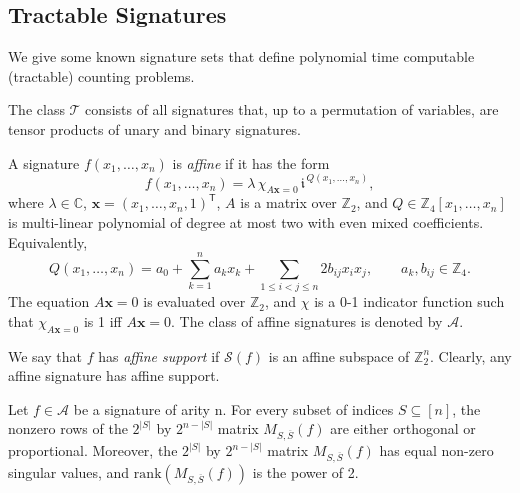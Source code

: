 
\subsection{Tractable Signatures}\label{subsec: tractable signatures}

We give some known signature sets that define polynomial time computable (tractable) counting problems.


\begin{definition}
    The class $\mathscr T$ consists of all signatures that, up to a
    permutation of variables, are tensor products of unary and binary signatures.
\end{definition}


\begin{definition}\label{def: affine}
A signature $f(x_1,\ldots,x_n)$ is \emph{affine} if it has the form
\[
f(x_1,\ldots,x_n)
=\lambda\,\chi_{A\mathbf x=0}\,
 \mathfrak i^{\,Q(x_1,\ldots,x_n)},
\]
where $\lambda\in\mathbb C$,
$\mathbf x=(x_1,\ldots,x_n,1)^{\mathsf T}$, $A$ is a matrix over
$\mathbb Z_2$, and $Q\in\mathbb Z_4[x_1,\ldots,x_n]$ is multi-linear polynomial of
degree at most two with even mixed coefficients.  
Equivalently,
\[
Q(x_1,\ldots,x_n)
=a_0+\sum_{k=1}^n a_kx_k
 +\sum_{1\le i<j\le n}2b_{ij}x_ix_j,
\qquad a_k,b_{ij}\in\mathbb Z_4.
\]
The equation $A\mathbf x=0$ is evaluated over $\mathbb Z_2$, and $\chi$ is a 0-1 indicator function such that $\chi_{A\mathbf{x}=0}$ is 1 iff $A\mathbf{x}=0.$
The class of affine signatures is denoted by $\mathscr A$. 
\end{definition}

We say that
$f$ has \emph{affine support} if $\mathscr S(f)$ is an affine subspace of
$\mathbb Z_2^n$.
Clearly, any affine signature has affine support. 

\begin{lemma}\label{lm: affine singular value}
    Let $f\in \mathscr{A}$ be a signature of arity n.
    For every subset of indices $S\subseteq[n]$, the nonzero rows of the $2^{|S|}$ by $2^{n-|S|}$ matrix $M_{S,\overline{S}}(f)$ are either orthogonal or proportional.
    Moreover, the $2^{|S|}$ by $2^{n-|S|}$ matrix $M_{S,\overline{S}}(f)$ has equal non-zero singular values, and $\mathrm{rank}(M_{S,\overline{S}}(f))$ is the power of 2.
\end{lemma}

